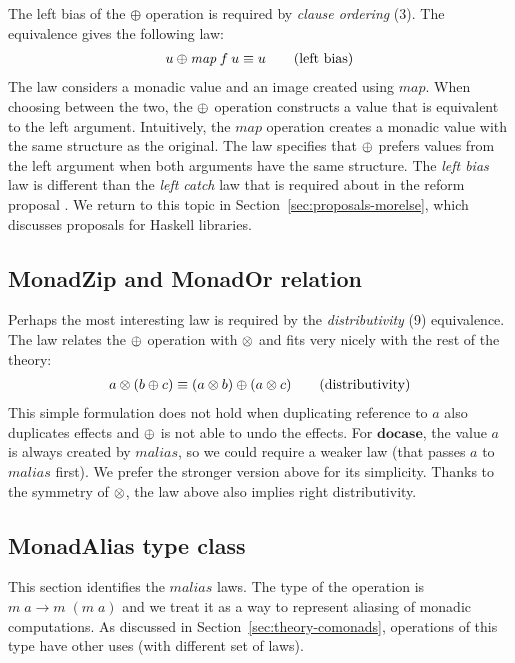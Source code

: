\documentclass{sigplanconf}
\newcommand{\Varid}[1]{\mathit{#1}}
\begin{document}
The left bias of the \ensuremath{\oplus} operation is required by \textit{clause ordering} (3).
The equivalence gives the following law:
\begin{align*}
  u \morelse \map \: f \: u \equiv u \tag{left bias}
\end{align*}
The law considers a monadic value and an image created using \ensuremath{\Varid{map}}. When choosing 
between the two, the $\oplus$ operation constructs a value that is equivalent to the left 
argument. Intuitively, the \ensuremath{\Varid{map}} operation creates a monadic value with the same structure as the 
original. The law specifies that $\oplus$ prefers values from the left argument when both 
arguments have the same structure.
The \textit{left bias} law is different than the \textit{left catch} law that is 
required about  in the  reform proposal \cite{monadplusreform}. 
We return to this topic in Section~\ref{sec:proposals-morelse}, which discusses proposals for 
Haskell libraries.

\subsection{MonadZip and MonadOr relation}
Perhaps the most interesting law is required by the \textit{distributivity} (9) equivalence.
The law relates the $\oplus$ operation with $\otimes$ and fits very nicely with the rest of the 
theory: 
\begin{align*}
  a \otimes (b \oplus c) \equiv (a \otimes b) \oplus (a \otimes c) \tag{distributivity}
\end{align*}
This simple formulation does not hold when duplicating reference to $a$ also duplicates effects 
and $\oplus$ is not able to undo the effects. For \ensuremath{\mathbf{docase}}, the value $a$ is always created by 
\ensuremath{\Varid{malias}}, so we could require a weaker law (that passes \ensuremath{\Varid{a}} to \ensuremath{\Varid{malias}} first). We prefer the 
stronger version above for its simplicity. Thanks to the symmetry of $\otimes$, the law above also 
implies right distributivity.


\subsection{MonadAlias type class}
This section identifies the \ensuremath{\Varid{malias}} laws. The type of the operation is \ensuremath{\Varid{m}\;\Varid{a}\to \Varid{m}\;(\Varid{m}\;\Varid{a})} and we 
treat it as a way to represent aliasing of monadic computations. As discussed in 
Section~\ref{sec:theory-comonads}, operations of this type have other uses (with different set 
of laws).
\end{document}
